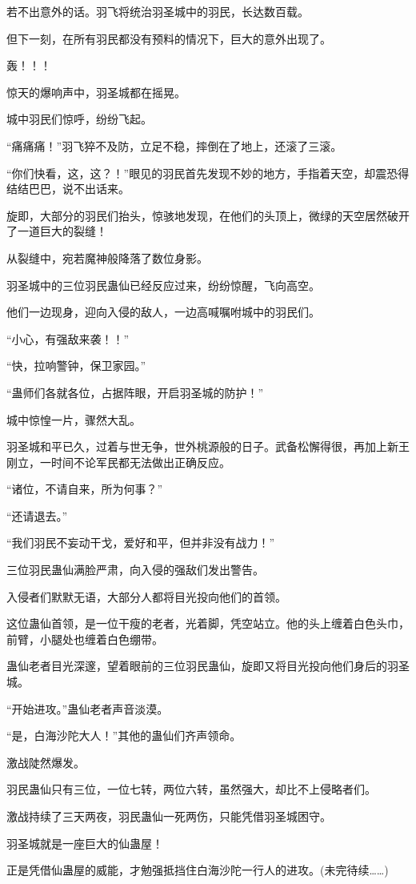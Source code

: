 \begin{this_body}
若不出意外的话。羽飞将统治羽圣城中的羽民，长达数百载。

但下一刻，在所有羽民都没有预料的情况下，巨大的意外出现了。

轰！！！

惊天的爆响声中，羽圣城都在摇晃。

城中羽民们惊呼，纷纷飞起。

“痛痛痛！”羽飞猝不及防，立足不稳，摔倒在了地上，还滚了三滚。

“你们快看，这，这？！”眼见的羽民首先发现不妙的地方，手指着天空，却震恐得结结巴巴，说不出话来。

旋即，大部分的羽民们抬头，惊骇地发现，在他们的头顶上，微绿的天空居然破开了一道巨大的裂缝！

从裂缝中，宛若魔神般降落了数位身影。

羽圣城中的三位羽民蛊仙已经反应过来，纷纷惊醒，飞向高空。

他们一边现身，迎向入侵的敌人，一边高喊嘱咐城中的羽民们。

“小心，有强敌来袭！！”

“快，拉响警钟，保卫家园。”

“蛊师们各就各位，占据阵眼，开启羽圣城的防护！”

城中惊惶一片，骤然大乱。

羽圣城和平已久，过着与世无争，世外桃源般的日子。武备松懈得很，再加上新王刚立，一时间不论军民都无法做出正确反应。

“诸位，不请自来，所为何事？”

“还请退去。”

“我们羽民不妄动干戈，爱好和平，但并非没有战力！”

三位羽民蛊仙满脸严肃，向入侵的强敌们发出警告。

入侵者们默默无语，大部分人都将目光投向他们的首领。

这位蛊仙首领，是一位干瘦的老者，光着脚，凭空站立。他的头上缠着白色头巾，前臂，小腿处也缠着白色绷带。

蛊仙老者目光深邃，望着眼前的三位羽民蛊仙，旋即又将目光投向他们身后的羽圣城。

“开始进攻。”蛊仙老者声音淡漠。

“是，白海沙陀大人！”其他的蛊仙们齐声领命。

激战陡然爆发。

羽民蛊仙只有三位，一位七转，两位六转，虽然强大，却比不上侵略者们。

激战持续了三天两夜，羽民蛊仙一死两伤，只能凭借羽圣城困守。

羽圣城就是一座巨大的仙蛊屋！

正是凭借仙蛊屋的威能，才勉强抵挡住白海沙陀一行人的进攻。(未完待续……)

\end{this_body}

